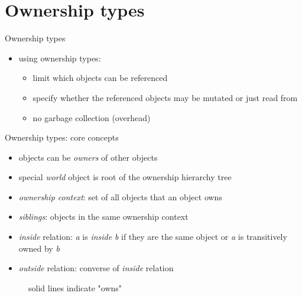 \documentclass{beamer}
\begin{document}
\section{Ownership types}

\begin{frame}{Ownership types}
\begin{itemize}
  \item using ownership types:
  \begin{itemize}
    \item limit which objects can be referenced
    \item specify whether the referenced objects may be mutated or just read from
    \item no garbage collection (overhead)
  \end{itemize}
\end{itemize}
\end{frame}


\begin{frame}{Ownership types: core concepts}
\begin{itemize}
  \item objects can be \emph{owners} of other objects
  \item special \emph{world} object is root of the ownership hierarchy tree
  \item \emph{ownership context}: set of all objects that an object owns
  \item \emph{siblings}: objects in the same ownership context
  \item \emph{inside} relation: \emph{a} is \emph{inside} \emph{b} if they are the same object or \emph{a} is transitively owned by \emph{b}
  \item \emph{outside} relation: converse of \emph{inside} relation
\end{itemize}

\begin{figure}[fragile]

  \caption{solid lines indicate "owns"}
\end{figure}
\end{frame}
\end{document}
